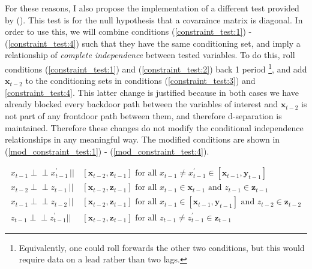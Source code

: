 \documentclass{article}
\def\indep{\perp \!\!\! \perp}
\begin{document}
For these reasons, I also propose the implementation of a different test provided by \citeauthor{srivastava2005some} (\citeyear{srivastava2005some}). This test is for the null hypothesis that a covaraince matrix is diagonal. In order to use this, we will combine conditions (\ref{constraint_test:1}) - (\ref{constraint_test:4}) such that they have the same conditioning set, and imply a relationship of \textit{complete independence} between tested variables. To do this, roll conditions (\ref{constraint_test:1}) and (\ref{constraint_test:2}) back 1 period \footnote{Equivalently, one could roll forwards the other two conditions, but this would require data on a lead rather than two lags.}, and add $\mathbf{x}_{t-2}$ to the conditioning sets in conditions (\ref{constraint_test:3}) and \ref{constraint_test:4}. This latter change is justified because in both cases we have already blocked every backdoor path between the variables of interest and $\mathbf{x}_{t-2}$ is not part of any frontdoor path between them, and therefore d-separation is maintained. Therefore these changes do not modify the conditional independence relationships in any meaningful way. The modified conditions are shown in (\ref{mod_constraint_test:1}) - (\ref{mod_constraint_test:4}).

\begin{align}
  x_{t-1} \indep x^{\prime}_{t-1} \,||\,& [\mathbf{x}_{t-2},\mathbf{z}_{t-1}] \text{ for all } x_{t-1} \neq x^{\prime}_{t-1} \in [\mathbf{x}_{t-1}, \mathbf{y}_{t-1}] \label{mod_constraint_test:1} \\
  x_{t-2} \indep z_{t-1} \,||\,& [\mathbf{x}_{t-2},\mathbf{z}_{t-1}] \text{ for all } x_{t-1} \in \mathbf{x}_{t-1} \text{ and } z_{t-1} \in \mathbf{z}_{t-1} \label{mod_constraint_test:3} \\
  x_{t-1} \indep z_{t-2} \,||\,& [\mathbf{x}_{t-2},\mathbf{z}_{t-1}] \text{ for all } x_{t-1} \in [\mathbf{x}_{t-1}, \mathbf{y}_{t-1}] \text{ and } z_{t-2} \in \mathbf{z}_{t-2} \label{mod_constraint_test:2} \\
  z_{t-1} \indep z^{\prime}_{t-1} || & [\mathbf{x}_{t-2},\mathbf{z}_{t-1}] \text{ for all } z_{t-1} \not = z^{\prime}_{t-1} \in \mathbf{z}_{t-1} \label{mod_constraint_test:4}
\end{align}
\end{document}
